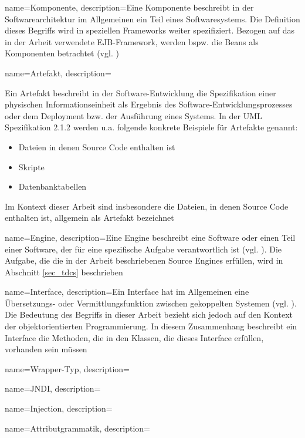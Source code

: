 

{
    name=Komponente,
    description={Eine Komponente beschreibt in der Softwarearchitektur im Allgemeinen ein Teil eines Softwaresystems. Die Definition dieses Begriffs wird in speziellen Frameworks weiter spezifiziert. Bezogen auf das in der Arbeit verwendete EJB-Framework, werden bspw. die Beans als Komponenten betrachtet (vgl. \cite{ejbspec})}
}
{
    name=Artefakt,
    description={Ein Artefakt beschreibt in der Software-Entwicklung die Spezifikation einer physischen Informationseinheit als Ergebnis des Software-Entwicklungsprozesses oder dem Deployment bzw. der Ausführung eines Systems. In der UML Spezifikation 2.1.2 \cite{uml} werden u.a. folgende konkrete Beispiele für Artefakte genannt:
    \begin{itemize}
    \item Dateien in denen Source Code enthalten ist
    \item Skripte
    \item Datenbanktabellen    
    \end{itemize}
    \noindent
    Im Kontext dieser Arbeit sind insbesondere die Dateien, in denen Source Code enthalten ist, allgemein als Artefakt bezeichnet}
}


{
    name=Engine,
    description={Eine Engine beschreibt eine Software oder einen Teil einer Software, der für eine spezifische Aufgabe verantwortlich ist (vgl. \cite{pcmag}). Die Aufgabe, die die in der Arbeit beschriebenen Source Engines erfüllen, wird in Abschnitt \ref{sec_tdcs} beschrieben}
}


{
    name=Interface,
    description={Ein Interface hat im Allgemeinen eine Übersetzungs- oder Vermittlungsfunktion zwischen gekoppelten Systemen (vgl. \cite{interfaces}). Die Bedeutung des Begriffs in dieser Arbeit bezieht sich jedoch auf den Kontext der objektorientierten Programmierung. In diesem Zusammenhang beschreibt ein Interface die Methoden, die in den Klassen, die dieses Interface erfüllen, vorhanden sein müssen}
}


{
    name=Wrapper-Typ,
    description={}
}

{
    name=JNDI,
    description={}
}


{
    name=Injection,
    description={}
}

{
    name=Attributgrammatik,
    description={}
}

